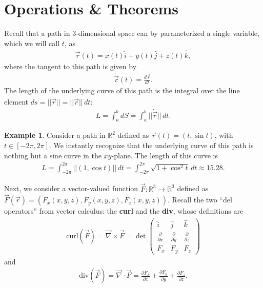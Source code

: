 \documentclass{book}
\theoremstyle{definition}
\newtheorem{exmp}{Example}[section]
\begin{document}
\section{Operations \& Theorems}
Recall that a path in 3-dimensional space can by parameterized a single variable, which we will call $t$, as
\begin{align*}
\vec{r}(t) = x(t)\hat{i} + y(t)\hat{j} + z(t)\hat{k},
\end{align*}
where the tangent to this path is given by
\begin{align*}
\dot{\vec{r}}(t) = \frac{d \vec{r}}{dt}.
\end{align*}
The length of the underlying curve of this path is the integral over the line element $ds = \vert\vert \vec{r} \vert\vert = \vert\vert \dot{\vec{r}} \vert\vert\,dt$:
\begin{align*}
L = \int_{a}^{b} dS = \int_{a}^{b} \vert\vert \dot{\vec{r}} \vert\vert\,dt.
\end{align*} 
\begin{exmp}
Consider a path in $\mathbb{R}^2$ defined as $\vec{r}(t) = (t, \sin t)$, with $t \in [-2\pi, 2\pi]$. We instantly recognize that the underlying curve of this path is nothing but a sine curve in the $xy$-plane. The length of this curve is
\begin{align*}
L = \int_{-2\pi}^{2\pi}\vert\vert  (1,\cos t)\vert\vert\,dt  = \int_{-2\pi}^{2\pi} \sqrt{1+\cos^2 t}\,dt \approx 15.28.
\end{align*}
\end{exmp}
Next, we consider a vector-valued function $\vec{F} : \mathbb{R}^3 \rightarrow \mathbb{R}^3$ defined as $\vec{F}(\vec{r}) = (F_x(x,y,z), F_y(x,y,z),F_z(x,y,z))$. Recall the two ``del operators'' from vector calculus: the \textbf{curl} and the \textbf{div}, whose definitions are
\begin{align*}
\text{curl}(\vec{F}) = \vec{\nabla} \times \vec{F} = \det
\begin{pmatrix}
\hat{i} & \hat{j} & \hat{k} \\
\frac{\partial}{\partial x} & \frac{\partial }{\partial y} & \frac{\partial}{\partial z}\\
F_x & F_y & F_z
\end{pmatrix}
\end{align*}
and 
\begin{align*}
\text{div}(\vec{F}) = \vec{\nabla} \cdot \vec{F} = 
\frac{\partial F_x}{\partial x} + \frac{\partial F_y }{\partial y} + \frac{\partial F_z}{\partial z}.
\end{align*}
\end{document}
